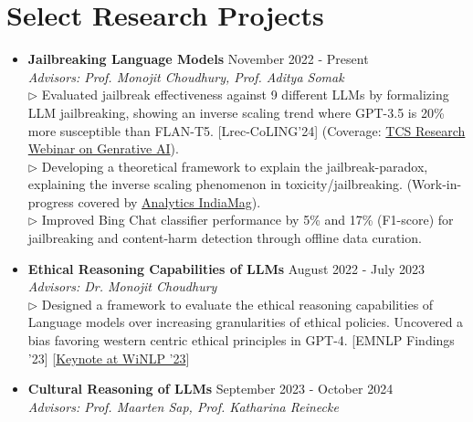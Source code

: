 \documentclass[11pt,letterpaper]{article}
\begin{document}
    \section*{Select Research Projects}
    \begin{itemize}[leftmargin=*,label={},itemsep=6pt]
        \item \textbf{Jailbreaking Language Models} \hfill November 2022 - Present\\
            \textit{Advisors: Prof. Monojit Choudhury, Prof. Aditya Somak}\\
            $\triangleright$ 
                Evaluated jailbreak effectiveness against 9 different LLMs by formalizing LLM jailbreaking, showing an
                inverse scaling trend where GPT-3.5 is 20\% more susceptible than FLAN-T5. [Lrec-CoLING'24] (Coverage: \href{https://www.linkedin.com/events/7086646211360821248/comments/}{TCS Research Webinar on
                    Genrative AI}).
            \\
            $\triangleright$ 
                Developing a theoretical framework to explain the jailbreak-paradox, explaining the inverse scaling
                phenomenon in toxicity/jailbreaking. (Work-in-progress covered by \href{https://analyticsindiamag.com/ai-trends/now-jailbreakers-are-taking-over-indian-llms/}{Analytics IndiaMag}).
            \\
            $\triangleright$ 
                Improved Bing Chat classifier performance by 5\% and 17\% (F1-score) for jailbreaking and content-harm
                detection through offline data curation.
            \\
        \item \textbf{Ethical Reasoning Capabilities of LLMs} \hfill August 2022 - July 2023\\
            \textit{Advisors: Dr. Monojit Choudhury}\\
            $\triangleright$ 
                Designed a framework to evaluate the ethical reasoning capabilities of Language models over increasing
                granularities of ethical policies. Uncovered a bias favoring western centric ethical principles in
                GPT-4. [EMNLP Findings '23] [\href{https://2023.winlp.org/schedule/}{Keynote at WiNLP
                    '23}]
            \\
        \item \textbf{Cultural Reasoning of LLMs} \hfill September 2023 - October 2024\\
            \textit{Advisors: Prof. Maarten Sap, Prof. Katharina Reinecke}\\

\end{itemize}
\end{document}

